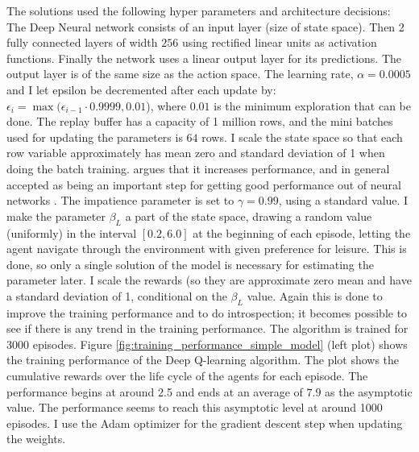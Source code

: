 The solutions used the following hyper parameters and architecture decisions: The Deep Neural network consists of an input layer (size of state space). Then  2 fully connected layers of width $256$ using rectified linear units as activation functions. Finally the network uses a linear output layer for its predictions. The output layer is of the same size as the action space. The learning rate, $\alpha=0.0005$ and I let epsilon be decremented after each update by: $\epsilon_i = \max (\epsilon_{i-1} \cdot 0.9999, 0.01$), where $0.01$ is the minimum exploration that can be done. The replay buffer has a capacity of 1 million rows, and the mini batches used for updating the parameters is $64$ rows. I scale the state space so that each row variable approximately has mean zero and standard deviation of 1 when doing the batch training. \textcite{goodfellow_deep_2016} argues that it increases performance, and in general accepted as being an important step for getting good performance out of neural networks . The impatience parameter is set to $\gamma=0.99$, using a standard value. I make the parameter $\beta_L$ a part of the state space, drawing a random value (uniformly) in the interval $[0.2, 6.0]$ at the beginning of each episode, letting the agent navigate through the environment with given preference for leisure. This is done, so only a single solution of the model is necessary for estimating the parameter later. I scale the rewards (so they are approximate zero mean and have a standard deviation of 1, conditional on the $\beta_L$ value. Again this is done to improve the training performance and to do introspection; it becomes possible to see if there is any trend in the training performance. The algorithm is trained for 3000 episodes. Figure \ref{fig:training_performance_simple_model}  (left plot) shows the training performance of the Deep Q-learning algorithm. The plot shows the cumulative rewards over the life cycle of the agents for each episode. The performance begins at around 2.5 and ends at an average of $7.9$ as the asymptotic value. The performance seems to reach this asymptotic level at around 1000 episodes. I use the Adam optimizer for the gradient descent step when updating the weights.

